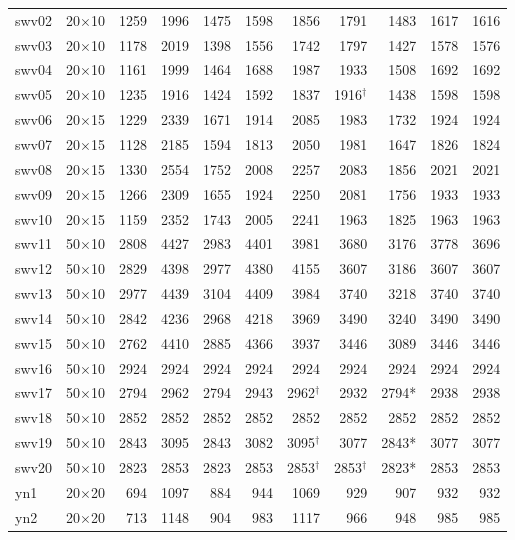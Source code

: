 {\begin{longtable}{lrrrrrrrrrr}
swv02 & 20$\times$10 & 1259 & 1996 & 1475 & 1598 & 1856 & 1791 & 1483 & 1617 & 1616 \\
swv03 & 20$\times$10 & 1178 & 2019 & 1398 & 1556 & 1742 & 1797 & 1427 & 1578 & 1576 \\
swv04 & 20$\times$10 & 1161 & 1999 & 1464 & 1688 & 1987 & 1933 & 1508 & 1692 & 1692 \\
swv05 & 20$\times$10 & 1235 & 1916 & 1424 & 1592 & 1837 & 1916$^\dagger$ & 1438 & 1598 & 1598 \\
swv06 & 20$\times$15 & 1229 & 2339 & 1671 & 1914 & 2085 & 1983 & 1732 & 1924 & 1924 \\
swv07 & 20$\times$15 & 1128 & 2185 & 1594 & 1813 & 2050 & 1981 & 1647 & 1826 & 1824 \\
swv08 & 20$\times$15 & 1330 & 2554 & 1752 & 2008 & 2257 & 2083 & 1856 & 2021 & 2021 \\
swv09 & 20$\times$15 & 1266 & 2309 & 1655 & 1924 & 2250 & 2081 & 1756 & 1933 & 1933 \\
swv10 & 20$\times$15 & 1159 & 2352 & 1743 & 2005 & 2241 & 1963 & 1825 & 1963 & 1963 \\
swv11 & 50$\times$10 & 2808 & 4427 & 2983 & 4401 & 3981 & 3680 & 3176 & 3778 & 3696 \\
swv12 & 50$\times$10 & 2829 & 4398 & 2977 & 4380 & 4155 & 3607 & 3186 & 3607 & 3607 \\
swv13 & 50$\times$10 & 2977 & 4439 & 3104 & 4409 & 3984 & 3740 & 3218 & 3740 & 3740 \\
swv14 & 50$\times$10 & 2842 & 4236 & 2968 & 4218 & 3969 & 3490 & 3240 & 3490 & 3490 \\
swv15 & 50$\times$10 & 2762 & 4410 & 2885 & 4366 & 3937 & 3446 & 3089 & 3446 & 3446 \\
swv16 & 50$\times$10 & 2924 & 2924 & 2924 & 2924 & 2924 & 2924 & 2924 & 2924 & 2924 \\
swv17 & 50$\times$10 & 2794 & 2962 & 2794 & 2943 & 2962$^\dagger$ & 2932 & 2794* & 2938 & 2938 \\
swv18 & 50$\times$10 & 2852 & 2852 & 2852 & 2852 & 2852 & 2852 & 2852 & 2852 & 2852 \\
swv19 & 50$\times$10 & 2843 & 3095 & 2843 & 3082 & 3095$^\dagger$ & 3077 & 2843* & 3077 & 3077 \\
swv20 & 50$\times$10 & 2823 & 2853 & 2823 & 2853 & 2853$^\dagger$ & 2853$^\dagger$ & 2823* & 2853 & 2853 \\
yn1 & 20$\times$20 & 694 & 1097 & 884 & 944 & 1069 & 929 & 907 & 932 & 932 \\
yn2 & 20$\times$20 & 713 & 1148 & 904 & 983 & 1117 & 966 & 948 & 985 & 985 \\

\end{longtable}}
